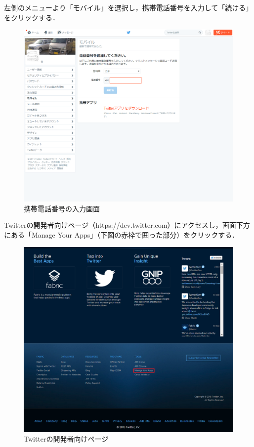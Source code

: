 \begin{description}
	左側のメニューより「モバイル」を選択し，携帯電話番号を入力して「続ける」をクリックする．
	
	\begin{figure}[H]
	\centering
	\includegraphics[width=15cm]{TwitterMobile1.png}
	\caption{携帯電話番号の入力画面}\label{mobile1}
	\end{figure}
	
	Twitterの開発者向けページ（https://dev.twitter.com）にアクセスし，画面下方にある「Manage Your Apps」（下図の赤枠で囲った部分）をクリックする．
	
	\begin{figure}[H]
	\centering
	\includegraphics[width=15cm]{dev_twitter.PNG}
	\caption{Twitterの開発者向けページ}\label{devTwitter}
	\end{figure}
	

\end{description}
